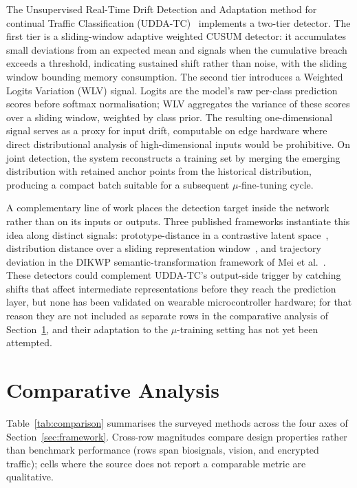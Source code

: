 \documentclass[conference]{IEEEtran}
\begin{document}
The Unsupervised Real-Time Drift Detection and Adaptation method
for continual Traffic Classification (UDDA-TC)~\cite{b6} implements a
two-tier detector. The first tier is a sliding-window adaptive
weighted CUSUM detector: it accumulates small deviations from an
expected mean and signals when the cumulative breach exceeds a
threshold, indicating sustained shift rather than noise, with the
sliding window bounding memory consumption. The second tier introduces a Weighted Logits Variation (WLV)
signal. Logits are the model's raw per-class prediction scores
before softmax normalisation; WLV aggregates the variance of these
scores over a sliding window, weighted by class prior. The
resulting one-dimensional signal serves as a proxy for input
drift, computable on edge hardware where direct distributional
analysis of high-dimensional inputs would be prohibitive. On joint detection, the system
reconstructs a training set by merging the emerging distribution
with retained anchor points from the historical distribution,
producing a compact batch suitable for a subsequent
$\mu$-fine-tuning cycle.

A complementary line of work places the detection target inside
the network rather than on its inputs or outputs. Three published
frameworks instantiate this idea along distinct signals:
prototype-distance in a contrastive latent space~\cite{CADE},
distribution distance over a sliding representation
window~\cite{DriftLens}, and trajectory deviation in the DIKWP
semantic-transformation framework of Mei et al.~\cite{b7}. These
detectors could complement UDDA-TC's output-side trigger by
catching shifts that affect intermediate representations before
they reach the prediction layer, but none has been validated on
wearable microcontroller hardware; for that reason they are not
included as separate rows in the comparative analysis of
Section~\ref{sec:comparison}, and their adaptation to the
$\mu$-training setting has not yet been attempted.

\section{Comparative Analysis}
\label{sec:comparison}

Table~\ref{tab:comparison} summarises the surveyed methods across
the four axes of Section~\ref{sec:framework}. Cross-row magnitudes
compare design properties rather than benchmark performance (rows
span biosignals, vision, and encrypted traffic); cells where the
source does not report a comparable metric are qualitative.
\end{document}

